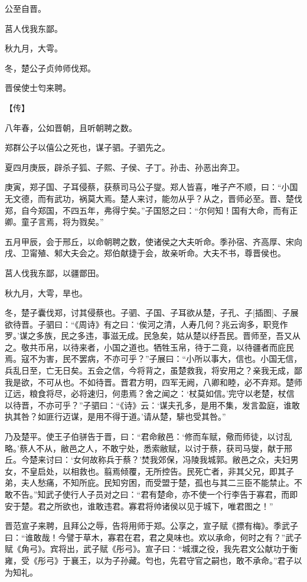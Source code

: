 \documentclass[a4paper,12pt,UTF8,twoside]{ctexbook}
\begin{document}
公至自晋。

莒人伐我东鄙。

秋九月，大雩。

冬，楚公子贞帅师伐郑。

晋侯使士匄来聘。

【传】

八年春，公如晋朝，且听朝聘之数。

郑群公子以僖公之死也，谋子驷。子驷先之。

夏四月庚辰，辟杀子狐、子熙、子侯、子丁。孙击、孙恶出奔卫。

庚寅，郑子国、子耳侵蔡，获蔡司马公子燮。郑人皆喜，唯子产不顺，曰：“小国无文德，而有武功，祸莫大焉。楚人来讨，能勿从乎？从之，晋师必至。晋、楚伐郑，自今郑国，不四五年，弗得宁矣。”子国怒之曰：“尔何知！国有大命，而有正卿。童子言焉，将为戮矣。”

五月甲辰，会于邢丘，以命朝聘之数，使诸侯之大夫听命。季孙宿、齐高厚、宋向戌、卫甯殖、邾大夫会之。郑伯献捷于会，故亲听命。大夫不书，尊晋侯也。

莒人伐我东鄙，以疆鄫田。

秋九月，大雩，旱也。

冬，楚子囊伐郑，讨其侵蔡也。子驷、子国、子耳欲从楚，子孔、子[插图]、子展欲待晋。子驷曰：“《周诗》有之曰：‘俟河之清，人寿几何？兆云询多，职竞作罗。’谋之多族，民之多违，事滋无成。民急矣，姑从楚以纾吾民。晋师至，吾又从之。敬共币帛，以待来者，小国之道也。牺牲玉帛，待于二竟，以待疆者而庇民焉。寇不为害，民不罢病，不亦可乎？”子展曰：“小所以事大，信也。小国无信，兵乱日至，亡无日矣。五会之信，今将背之，虽楚救我，将安用之？亲我无成，鄙我是欲，不可从也。不如待晋。晋君方明，四军无阙，八卿和睦，必不弃郑。楚师辽远，粮食将尽，必将速归，何患焉？舍之闻之：‘杖莫如信。’完守以老楚，杖信以待晋，不亦可乎？”子驷曰：“《诗》云：‘谋夫孔多，是用不集，发言盈庭，谁敢执其咎？如匪行迈谋，是用不得于道。’请从楚，騑也受其咎。”

乃及楚平。使王子伯骈告于晋，曰：“君命敝邑：‘修而车赋，儆而师徒，以讨乱略。’蔡人不从，敝邑之人，不敢宁处，悉索敝赋，以讨于蔡，获司马燮，献于邢丘。今楚来讨曰：‘女何故称兵于蔡？’焚我郊保，冯陵我城郭。敝邑之众，夫妇男女，不皇启处，以相救也。翦焉倾覆，无所控告。民死亡者，非其父兄，即其子弟，夫人愁痛，不知所庇。民知穷困，而受盟于楚，孤也与其二三臣不能禁止。不敢不告。”知武子使行人子员对之曰：“君有楚命，亦不使一个行李告于寡君，而即安于楚。君之所欲也，谁敢违君。寡君将帅诸侯以见于城下，唯君图之！”

晋范宣子来聘，且拜公之辱，告将用师于郑。公享之，宣子赋《摽有梅》。季武子曰：“谁敢哉！今譬于草木，寡君在君，君之臭味也。欢以承命，何时之有？”武子赋《角弓》。宾将出，武子赋《彤弓》。宣子曰：“城濮之役，我先君文公献功于衡雍，受《彤弓》于襄王，以为子孙藏。匄也，先君守官之嗣也，敢不承命。”君子以为知礼。
\end{document}
